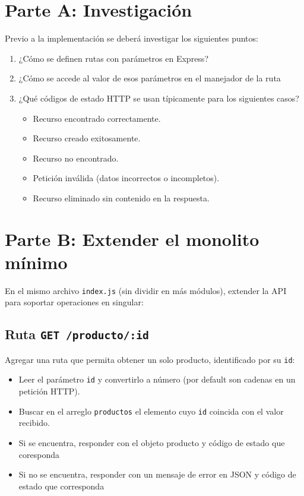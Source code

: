 \documentclass[11pt,a4paper]{article}
\begin{document}
\section{Parte A: Investigación}

Previo a la implementación se deberá investigar los siguientes puntos:

\begin{enumerate}
	\item ¿Cómo se definen rutas con parámetros en Express? %
	\item ¿Cómo se accede al valor de esos parámetros en el manejador de la ruta %
	\item ¿Qué códigos de estado HTTP se usan típicamente para los siguientes casos?
	\begin{itemize}
		\item Recurso encontrado correctamente.
		\item Recurso creado exitosamente.
		\item Recurso no encontrado.
		\item Petición inválida (datos incorrectos o incompletos).
		\item Recurso eliminado sin contenido en la respuesta.
	\end{itemize}
\end{enumerate}


\section{Parte B: Extender el monolito mínimo}

En el mismo archivo \texttt{index.js} (sin dividir en más módulos), extender la API para soportar operaciones en singular:

\subsection{Ruta \texttt{GET /producto/:id}}

Agregar una ruta que permita obtener un solo producto, identificado por su \texttt{id}:

\begin{itemize}
	\item Leer el parámetro \texttt{id} %
	y convertirlo a número (por default son cadenas en un petición HTTP).
	\item Buscar en el arreglo \texttt{productos} el elemento cuyo \texttt{id} coincida con el valor recibido.
	\item Si se encuentra, responder con el objeto producto y código de estado que coresponda  %
	\item Si no se encuentra, responder con un mensaje de error en JSON y código de estado que corresponda %
\end{itemize}
\end{document}
